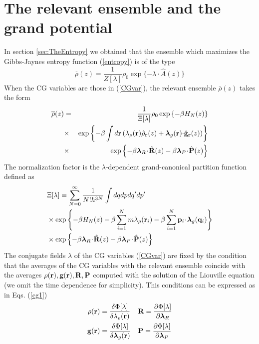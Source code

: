 \documentclass[a4paper,openright,12pt]{book}
\newcommand{\esc}{\!\cdot\!}
\begin{document}
\section{The relevant ensemble and the grand potential}
In section \ref{sec:TheEntropy} we obtained that the ensemble which maximizes the Gibbs-Jaynes entropy function (\ref{entropy}) is of the type
\begin{equation}
\overline{\rho}(z) = \frac{1}{Z[\lambda]} \rho_0\exp\{-\lambda\!\cdot\!\hat{A}(z)\}
\end{equation}
When the CG variables are those in (\ref{CGvar}), the relevant ensemble $\bar{\rho}(z)$ takes the form
\begin{eqnarray}
  \overline{\rho}(z)&=&\frac{1}{\Xi[\lambda]}\rho_0\exp\left\{-\beta H_N(z)\right\}
\nonumber\\
&\times&
\exp\left\{-\beta\int d{\bf r}\left(\lambda_\rho({\bf r})\hat{\rho}_{\bf
    r}(z)+\boldsymbol{\lambda}_g{({\bf r})\cdot}\hat{\bf g}_{\bf r}(z)\right)\right\}
\nonumber\\
&\times&
\exp\left\{-\beta \boldsymbol{\lambda}_{R}\esc\hat{\bf R}(z)
-\beta \boldsymbol{\lambda}_{P}\esc\hat{\bf P}(z)\right\}
\nonumber\\
\label{relensln}
\end{eqnarray}
The   normalization   factor   is  the   $\lambda$-dependent
grand-canonical partition function defined as
\begin{align}
&\Xi[\lambda]
\equiv
 \sum_{N=0}^\infty \frac{1}{N!h^{3N}}
\int dqdp dq'dp'
\nonumber\\
&\times\exp\left\{-\beta H_N(z)-\beta \sum_{i=1}^Nm\lambda_\rho({\bf
    r}_i)-\beta \sum_{i=1}^N{\bf p}_i\esc\boldsymbol{\lambda}_g({\bf q}_i)\right\}
\nonumber\\
&\times\exp\left\{-\beta \boldsymbol{\lambda}_{R}\esc\hat{\bf R}(z)
-\beta \boldsymbol{\lambda}_{P}\esc\hat{\bf P}(z)\right\}
\label{xiln}
\end{align}
The conjugate fields $\lambda$ of the CG variables (\ref{CGvar}) are fixed by the condition that the averages of the CG variables with the relevant ensemble coincide with the averages $\rho({\bf  r}),{\bf  g}({\bf
  r}),{\bf  R},{\bf  P}$  computed  with  the 
  solution of  the Liouville equation (we omit the time  dependence for simplicity). This conditions can be expressed as in Eqs. (\ref{cg1}) 
\begin{align}
  \rho({\bf r}) &=\frac{\delta \Phi [\lambda]}{\delta \lambda_\rho({\bf r}) }
&&{\bf R} =\frac{\partial \Phi [\lambda]}{\partial \boldsymbol{\lambda}_R }
\nonumber\\
  {\bf g}({\bf r}) &=\frac{\delta \Phi [\lambda]}{\delta \boldsymbol{\lambda}_g({\bf r}) }
&&{\bf P} =\frac{\partial \Phi [\lambda]}{\partial \boldsymbol{\lambda}_P }
\label{rgo}
\end{align}
\end{document}
